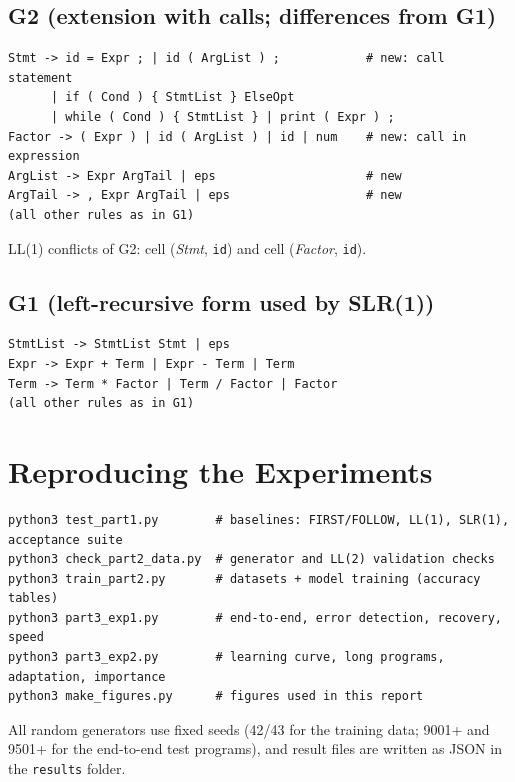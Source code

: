 \documentclass[12pt,a4paper]{article}
\newcommand{\ntm}[1]{\textit{#1}}
\newcommand{\tok}[1]{\texttt{#1}}
\begin{document}
\subsection{G2 (extension with calls; differences from G1)}
\begin{lstlisting}[numbers=none,language={}]
Stmt -> id = Expr ; | id ( ArgList ) ;            # new: call statement
      | if ( Cond ) { StmtList } ElseOpt
      | while ( Cond ) { StmtList } | print ( Expr ) ;
Factor -> ( Expr ) | id ( ArgList ) | id | num    # new: call in expression
ArgList -> Expr ArgTail | eps                     # new
ArgTail -> , Expr ArgTail | eps                   # new
(all other rules as in G1)
\end{lstlisting}

\noindent LL(1) conflicts of G2: cell (\ntm{Stmt}, \tok{id}) and cell
(\ntm{Factor}, \tok{id}).

\subsection{G1 (left-recursive form used by SLR(1))}
\begin{lstlisting}[numbers=none,language={}]
StmtList -> StmtList Stmt | eps
Expr -> Expr + Term | Expr - Term | Term
Term -> Term * Factor | Term / Factor | Factor
(all other rules as in G1)
\end{lstlisting}

\section{Reproducing the Experiments}

\begin{lstlisting}[numbers=none,language={}]
python3 test_part1.py        # baselines: FIRST/FOLLOW, LL(1), SLR(1), acceptance suite
python3 check_part2_data.py  # generator and LL(2) validation checks
python3 train_part2.py       # datasets + model training (accuracy tables)
python3 part3_exp1.py        # end-to-end, error detection, recovery, speed
python3 part3_exp2.py        # learning curve, long programs, adaptation, importance
python3 make_figures.py      # figures used in this report
\end{lstlisting}

\noindent All random generators use fixed seeds (42/43 for the training data; 9001+ and
9501+ for the end-to-end test programs), and result files are written as JSON in the
\texttt{results} folder.
\end{document}
